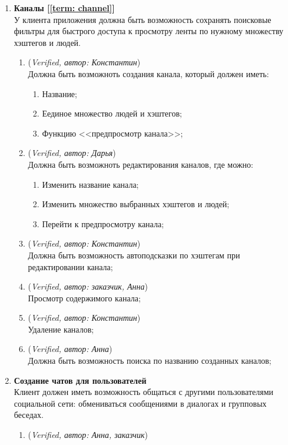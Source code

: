 \begin{enumerate}
\begin{enumerate}
	\end{enumerate}
	\item \textbf{Каналы [\ref{term: channel}] \\}
	У клиента приложения должна быть возможность сохранять поисковые фильтры для быстрого доступа к просмотру ленты по нужному множеству хэштегов и людей.
	\begin{enumerate}
		\item (\textit{Verified, автор: Константин}) \\
		Должна быть возможноть создания канала, который должен иметь:
		\begin{enumerate}
			\item Название;
			\item Еединое множество людей и хэштегов; 
			\item Функцию <<предпросмотр канала>>;
		\end{enumerate}
		\item (\textit{Verified, автор: Дарья}) \\
		Должна быть возможноть редактирования каналов, где можно:
		\begin{enumerate}
			\item Изменить название канала;
			\item Изменить множество выбранных хэштегов и людей;  
			\item Перейти к предпросмотру канала;
		\end{enumerate}
		\item (\textit{Verified, автор: Константин}) \\
		Должна быть возможность автоподсказки по хэштегам при редактировании канала; 
		\item (\textit{Verified, автор: заказчик, Анна}) \\
		Просмотр содержимого канала;
		\item (\textit{Verified, автор: Константин}) \\
		Удаление каналов;
		\item (\textit{Verified, автор: Анна})\\ 
		Должна быть возможность поиска по названию созданных каналов;
	\end{enumerate}
	\item \textbf{Создание чатов для пользователей\\}
	Клиент должен иметь возможность общаться с другими пользователями социальной сети: обмениваться сообщениями в диалогах и групповых беседах.
	\begin{enumerate}
		\item (\textit{Verified, автор: Анна, заказчик})\\

\end{enumerate}
\end{enumerate}

